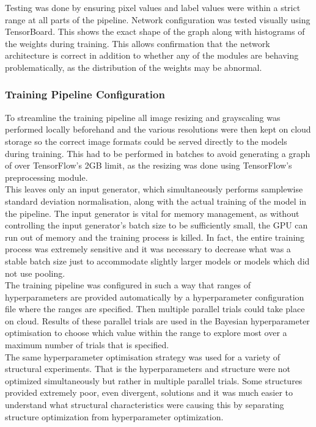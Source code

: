 \documentclass{article}
\begin{document}
Testing was done by ensuring pixel values and label values were within a strict range at all parts of the pipeline. Network configuration was tested visually using TensorBoard. This shows the exact shape of the graph along with histograms of the weights during training. This  allows confirmation that the network architecture is correct in addition to whether any of the modules are behaving problematically, as the distribution of the weights may be abnormal.

\subsubsection{Training Pipeline Configuration}
To streamline the training pipeline all image resizing and grayscaling was performed locally beforehand and the various resolutions were then kept on cloud storage so the correct image formats could be served directly to the models during training. This had to be performed in batches to avoid generating a graph of over TensorFlow's 2GB limit, as the resizing was done using TensorFlow's preprocessing module. \\

This leaves only an input generator, which simultaneously performs samplewise standard deviation normalisation, along with the actual training of the model in the pipeline.
The input generator is vital for memory management, as without controlling the input generator's batch size to be sufficiently small, the GPU can run out of memory and the training process is killed. In fact, the entire training process was extremely sensitive and it was necessary to decrease what was a stable batch size just to accommodate slightly larger models or models which did not use pooling. \\

The training pipeline was configured in such a way that ranges of hyperparameters are provided automatically by a hyperparameter configuration file where the ranges are specified. Then multiple parallel trials could take place on cloud. Results of these parallel trials are used in the Bayesian hyperparameter optimisation to choose which value within the range to explore most over a maximum number of trials that is specified. \\

The same hyperparameter optimisation strategy was used for a variety of structural experiments. That is the hyperparameters and structure were not optimized simultaneously but rather in multiple parallel trials. Some structures provided extremely poor, even divergent, solutions and it was much easier to understand what structural characteristics were causing this by separating structure optimization from hyperparameter optimization.\\
\end{document}
